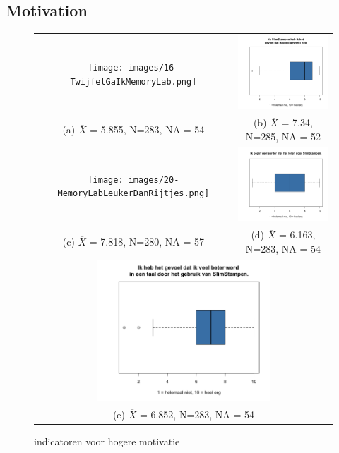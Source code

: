 \documentclass[12pt, a4paper]{article}
\begin{document}
{{\subsection{Motivation}
\begin{figure}
    \begin{tabular}{cc}
      \texttt{[image: images/16-TwijfelGaIkMemoryLab.png]} &   \includegraphics[width=65mm]{images/19-GevoelGoedGewerkt.png} \\
    (a) $\overline{X}$ = 5.855, N=283, NA = 54   & (b) $\overline{X}$ = 7.34, N=285, NA = 52  \\[6pt]
     \texttt{[image: images/20-MemoryLabLeukerDanRijtjes.png]} &   \includegraphics[width=65mm]{images/21-BeginEerder.png} \\
    (c) $\overline{X}$ = 7.818, N=280, NA = 57  & (d) $\overline{X}$ = 6.163, N=283, NA = 54  \\[6pt]
    \multicolumn{2}{c}{\includegraphics[width=65mm]{23-BeterInTaal.png} }\\
    \multicolumn{2}{c}{(e) $\overline{X}$ = 6.852, N=283, NA = 54}
    \end{tabular}
    \caption{indicatoren voor hogere motivatie}
    \label{fig:motivatie}
    \end{figure}

}}
\end{document}
